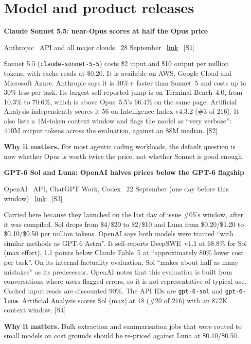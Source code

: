\documentclass[11pt,a4paper]{article}
\newcommand{\entry}[4]{%
  \par\vspace{0.7em}%
  {\sffamily\bfseries\color{brandink}#1}\par
  {\footnotesize\color{brandgrey}#2 \textbullet\ \href{#3}{link} \textbullet\ \srcref{#4}}\par
  \vspace{0.15em}}
\newcommand{\why}[1]{\par{\small\textbf{Why it matters.} #1}\par}
\newcommand{\srcref}[1]{\textcolor{brandaccent}{[S#1]}}
\begin{document}
\section{Model and product releases}

\entry{Claude Sonnet 5.5: near-Opus scores at half the Opus price}{Anthropic \textbullet\ API and all major clouds \textbullet\ 28 September}{https://www.anthropic.com/claude-sonnet-5-5}{1}
Sonnet 5.5 (\texttt{claude-sonnet-5-5}) costs \$2 input and \$10 output per million tokens,
with cache reads at \$0.20. It is available on AWS, Google Cloud and Microsoft Azure.
Anthropic says it is 30\%+ faster than Sonnet~5 and costs up to 30\% less per task.
Its largest self-reported jump is on Terminal-Bench~4.0, from 10.3\% to 70.6\%, which
is above Opus~5.5's 66.4\% on the same page. Artificial Analysis independently scores it
56 on Intelligence Index v4.3.2 (\#3 of 216). It also lists a 1M-token context window
and flags the model as ``very verbose'': 410M output tokens across the evaluation,
against an 88M median. \srcref{2}
\why{For most agentic coding workloads, the default question is now whether Opus is worth twice the price, not whether Sonnet is good enough.}

\entry{GPT-6 Sol and Luna: OpenAI halves prices below the GPT-6 flagship}{OpenAI \textbullet\ API, ChatGPT Work, Codex \textbullet\ 22 September (one day before this window)}{https://openai.com/index/introducing-gpt-6-sol-and-luna/}{3}
Carried here because they launched on the last day of issue \#05's window, after it was compiled.
Sol drops from \$4/\$20 to \$2/\$10 and Luna from \$0.20/\$1.20 to \$0.10/\$0.50 per million tokens.
OpenAI says both models were trained ``with similar methods as GPT-6 Astra''.
It self-reports DeepSWE~v1.1 at 68.8\% for Sol (max effort), 1.1 points below Claude Fable~5
at ``approximately 80\% lower cost per task''. On its internal factuality evaluation,
Sol ``makes about half as many mistakes'' as its predecessor. OpenAI notes that this
evaluation is built from conversations where users flagged errors, so it is not representative of
typical use. Cached input reads are discounted 90\%. The API IDs are \texttt{gpt-6-sol} and
\texttt{gpt-6-luna}. Artificial Analysis scores Sol (max) at 48 (\#20 of 216) with an 872K context window. \srcref{4}
\why{Bulk extraction and summarisation jobs that were routed to small models on cost grounds should be re-priced against Luna at \$0.10/\$0.50.}
\end{document}

